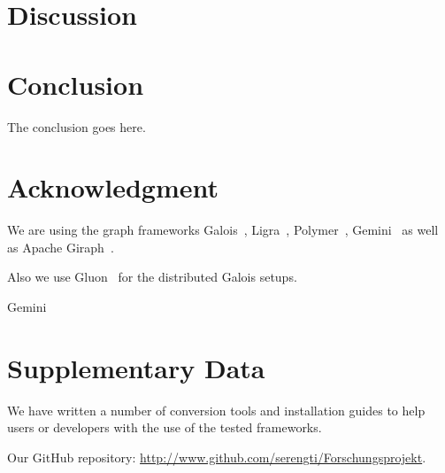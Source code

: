 \documentclass[conference,a4paper]{IEEEtran}
\begin{document}
\section{Discussion}




\section{Conclusion}
The conclusion goes here.


\clearpage


\section*{Acknowledgment}
We are using the graph frameworks Galois~\cite{Galois}, Ligra~\cite{Ligra}, Polymer~\cite{Polymer}, Gemini~\cite{Gemini} as well as Apache Giraph~\cite{Giraph}.

Also we use Gluon~\cite{vertGalois} for the distributed Galois setups.

Gemini~\cite{Gemini}


\section*{Supplementary Data}\label{supplementaryData}
We have written a number of conversion tools and installation guides to help
users or developers with the use of the tested frameworks.


Our GitHub repository: \url{http://www.github.com/serengti/Forschungsprojekt}.






\end{document}
